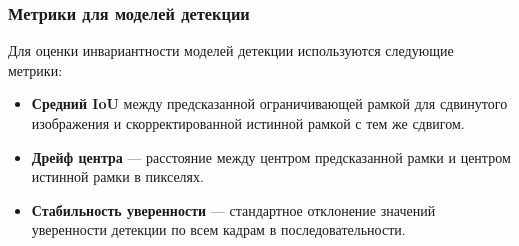 \subsubsection{Метрики для моделей детекции}
\label{sec:evaluation:detection}

Для оценки инвариантности моделей детекции используются следующие метрики:

\begin{itemize}
    \item \textbf{Средний IoU} между предсказанной ограничивающей рамкой для сдвинутого изображения и скорректированной истинной рамкой с тем же сдвигом.
    
    \item \textbf{Дрейф центра} — расстояние между центром предсказанной рамки и центром истинной рамки в пикселях.
    
    \item \textbf{Стабильность уверенности} — стандартное отклонение значений уверенности детекции по всем кадрам в последовательности.
\end{itemize}

\newpage
